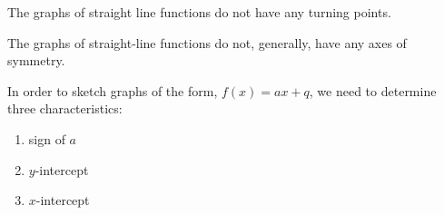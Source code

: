           
          \label{m39338*id239341}The graphs of straight line functions do not have any turning points.\par 
        
        \label{m39338*uid88}
            \nopagebreak
            
          
          \label{m39338*id239358}The graphs of straight-line functions do not, generally, have any axes of symmetry.\par 
        
        \label{m39338*uid89}
            \nopagebreak
            
          
          \label{m39338*id239401}In order to sketch graphs of the form, \begin{math}f\left(x\right)=ax+q\end{math}, we need to determine three characteristics:\par 
          \label{m39338*id239434}\begin{enumerate}[noitemsep, label=\textbf{\arabic*}. ] 
            \label{m39338*uid90}\item sign of \begin{math}a\end{math}\label{m39338*uid91}\item \begin{math}y\end{math}-intercept
\label{m39338*uid92}\item \begin{math}x\end{math}-intercept
\end{enumerate}
        
